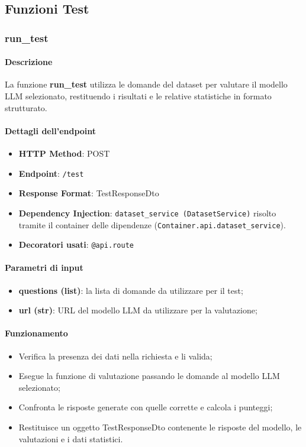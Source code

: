 \subsection{Funzioni Test}
\label{subsec:TestRequests}

\subsubsection{run\_test}  
\label{subsubsec:runtest}

\paragraph{Descrizione}  
La funzione \textbf{run\_test} utilizza le domande del dataset per valutare il modello LLM selezionato, restituendo i risultati e le relative statistiche in formato strutturato.


\paragraph{Dettagli dell'endpoint}
\begin{itemize}
    \item \textbf{HTTP Method}: POST
    \item \textbf{Endpoint}: \texttt{/test}
    \item \textbf{Response Format}: TestResponseDto
    \item \textbf{Dependency Injection}: \texttt{dataset\_service (DatasetService)} risolto tramite il container delle dipendenze (\texttt{Container.api.dataset\_service}). 
    \item \textbf{Decoratori usati}: \texttt{@api.route}
\end{itemize}

\paragraph{Parametri di input}
\begin{itemize}
    \item \textbf{questions (list)}: la lista di domande da utilizzare per il test;
    \item \textbf{url (str)}: URL del modello LLM da utilizzare per la valutazione;
\end{itemize}

\paragraph{Funzionamento}
\begin{itemize}
    \item Verifica la presenza dei dati nella richiesta e li valida;
    \item Esegue la funzione di valutazione passando le domande al modello LLM selezionato;
    \item Confronta le risposte generate con quelle corrette e calcola i punteggi;
    \item Restituisce un oggetto TestResponseDto contenente le risposte del modello, le valutazioni e i dati statistici.
\end{itemize}

